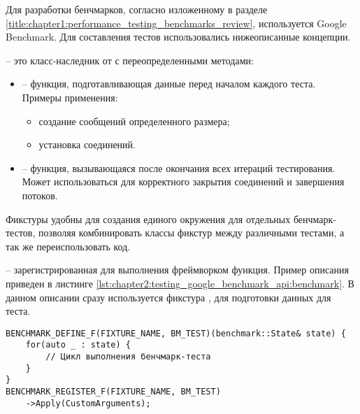 Для разработки бенчмарков, согласно изложенному в разделе \ref{title:chapter1:performance_testing_benchmarks_review}, используется Google Benchmark. Для составления тестов использовались нижеописанные концепции.

\begin{description}[noitemsep]
	\item [Фикстуры] -- это класс-наследник от  с переопределенными методами:
	\begin{itemize}[noitemsep]
		\item {} -- функция, подготавливающая данные перед началом каждого теста. Примеры применения: 
		\begin{itemize}[noitemsep]
			\item создание сообщений определенного размера; 
			\item установка соединений.
		\end{itemize}
		\item {} -- функция, вызывающаяся после окончания всех итераций тестирования. Может использоваться для корректного закрытия соединений и завершения потоков.
	\end{itemize}
	Фикстуры удобны для создания единого окружения для отдельных бенчмарк-тестов, позволяя комбинировать классы фикстур между различными тестами, а так же переиспользовать код.

	\item [Бенчмарк-тест] -- зарегистрированная для выполнения фреймворком функция. Пример описания приведен в листинге \ref{lst:chapter2:testing_google_benchmark_api:benchmark}. В данном описании сразу используется фикстура , для подготовки данных для теста.
	
	\begin{lstlisting}[label=lst:chapter2:testing_google_benchmark_api:benchmark, caption=Описание бенчмарка с фикстурой]
BENCHMARK_DEFINE_F(FIXTURE_NAME, BM_TEST)(benchmark::State& state) {
	for(auto _ : state) {
		// Цикл выполнения бенчмарк-теста
	}
}
BENCHMARK_REGISTER_F(FIXTURE_NAME, BM_TEST)
	->Apply(CustomArguments);
	\end{lstlisting}
	

\end{description}
